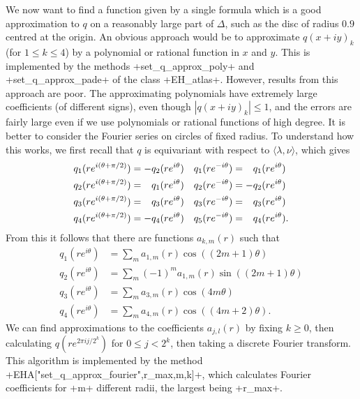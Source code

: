 \documentclass[reqno]{amsart}
\newcommand{\Dl}        {\Delta}
\newcommand{\tht}       {\theta}
\newcommand{\lm}        {\lambda}
\newcommand{\ip}[1]     {\langle #1\rangle}
\newcommand{\pp}        {\hphantom{+}}
\renewcommand{\:}{\colon}
\theoremstyle{definition}
\begin{document}
We now want to find a function given by a single formula which is a
good approximation to $q$ on a reasonably large part of $\Dl$, such as
the disc of radius $0.9$ centred at the origin.  An obvious approach
would be to approximate $q(x+iy)_k$ (for $1\leq k\leq 4$) by a
polynomial or rational function in $x$ and $y$.  This is implemented
by the methods \mcode+set_q_approx_poly+ and \mcode+set_q_approx_pade+
of the class \mcode+EH_atlas+.  However, results from this
approach are poor.  The approximating polynomials have extremely large
coefficients (of different signs), even though $|q(x+iy)_k|\leq 1$,
and the errors are fairly large even if we use polynomials or rational
functions of high degree.  It is better to consider the Fourier series
on circles of fixed radius.  To understand how this works, we first
recall that $q$ is equivariant with respect to $\ip{\lm,\nu}$, which
gives
\begin{align*}
 q_1(re^{i(\tht+\pi/2)}) &=    -q_2(re^{i\tht}) &
 q_1(re^{-i\tht})        &= \pp q_1(re^{i\tht}) \\
 q_2(re^{i(\tht+\pi/2)}) &= \pp q_1(re^{i\tht}) &
 q_2(re^{-i\tht})        &=    -q_2(re^{i\tht}) \\
 q_3(re^{i(\tht+\pi/2)}) &= \pp q_3(re^{i\tht}) &
 q_3(re^{-i\tht})        &= \pp q_3(re^{i\tht}) \\
 q_4(re^{i(\tht+\pi/2)}) &=    -q_4(re^{i\tht}) &
 q_5(re^{-i\tht})        &= \pp q_4(re^{i\tht}).
\end{align*}
From this it follows that there are functions $a_{k,m}(r)$ such that
\begin{align*}
 q_1(r e^{i\tht}) &= \sum_m a_{1,m}(r) \cos((2m+1)\tht) \\
 q_2(r e^{i\tht}) &= \sum_m (-1)^m a_{1,m}(r) \sin((2m+1)\tht) \\
 q_3(r e^{i\tht}) &= \sum_m a_{3,m}(r) \cos(4m\tht) \\
 q_4(r e^{i\tht}) &= \sum_m a_{4,m}(r) \cos((4m+2)\tht).
\end{align*}
We can find approximations to the coefficients $a_{j,l}(r)$ by fixing
$k\geq 0$, then calculating $q(re^{2\pi ij/2^k})$ for $0\leq j<2^k$, then
taking a discrete Fourier transform.  This algorithm is implemented by the
method \mcode+EHA["set_q_approx_fourier",r_max,m,k]+, which calculates
Fourier coefficients for \mcode+m+ different radii, the largest being
\mcode+r_max+.
\end{document}
